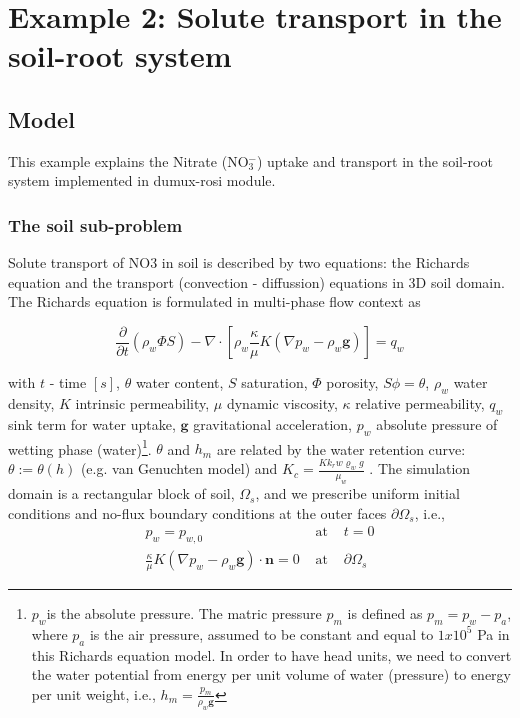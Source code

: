 \chapter*{Example 2: Solute transport in the soil-root system}

\section*{Model}

This example explains the Nitrate (NO$_3^-$) uptake and transport in the soil-root system implemented in dumux-rosi module.

\subsection*{The soil sub-problem}

Solute transport of NO3 in soil is described by two equations: the Richards
equation and the transport (convection - diffussion) equations in
3D soil domain. The Richards equation is formulated in multi-phase
flow context as

\[
\frac{\partial}{\partial t}\left(\rho_{w}\Phi S\right)-\nabla\cdot\left[\rho_{w}\frac{\kappa}{\mu}K\left(\nabla p_{w}-\rho_{w}\boldsymbol{g}\right)\right]=q_{w}
\]

with $t$ - time $[s]$, $\theta$ water content, $S$ saturation,
$\Phi$ porosity, $S\phi=\theta$, $\rho_{w}$ water density, $K$
intrinsic permeability, $\mu$ dynamic viscosity, $\kappa$ relative
permeability, $q_{w}$ sink term for water uptake, $\boldsymbol{g}$
gravitational acceleration, $p_{w}$ absolute pressure of wetting
phase (water)\footnote{$p_{w}$is the absolute pressure. The matric pressure $p_{m}$ is
defined as $p_{m}=p_{w}-p_{a}$, where $p_{a}$ is the air pressure,
assumed to be constant and equal to $1x10^{5}$ Pa in this Richards
equation model. In order to have head units, we need to convert the
water potential from energy per unit volume of water (pressure) to
energy per unit weight, i.e., $h_{m}=\frac{p_{m}}{\rho_{w}\boldsymbol{g}}$}. $\theta$ and $h_{m}$ are related by the water retention curve:
$\theta:=\theta(h)$ (e.g. van Genuchten model) and $K_{c}=\frac{Kk_{r}w\varrho_{w}g}{\mu_{w}}$
. The simulation domain is a rectangular block of soil, $\Omega_{s}$,
and we prescribe uniform initial conditions and no-flux boundary conditions
at the outer faces $\partial\Omega_{s}$, i.e., 
\begin{eqnarray}
p_{w}=p_{w,0} & \text{ at } & t=0\\
\frac{\kappa}{\mu}K\left(\nabla p_{w}-\rho_{w}\boldsymbol{g}\right) \cdot \mathbf{n}=0 & \text{ at } & \partial\Omega_{s}
\end{eqnarray}

